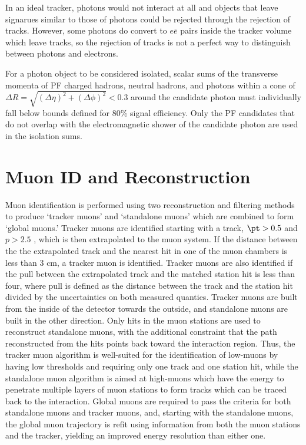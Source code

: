  In an ideal tracker, photons would not interact 
  at all and objects that leave signarues
  similar to those of photons could be rejected
  through the rejection of tracks.
 However, some photons do convert to $e\overline{e}$
  pairs inside the tracker volume which leave tracks,
  so the rejection of tracks is not a perfect way 
  to distinguish between photons and electrons.

For a photon object to be considered isolated,
 scalar sums of the transverse momenta of PF charged hadrons, neutral
 hadrons, and photons within a cone of $\Delta R = \sqrt{(\Delta
  \eta)^2 + (\Delta \phi)^2} < 0.3$ around the candidate photon must
 individually fall below bounds defined for 80\% signal
 efficiency. 
Only the PF candidates that do not overlap with the 
 electromagnetic shower of the candidate photon are used in the 
 isolation sums.


\section{Muon ID and Reconstruction}

 Muon identification is performed using
  two reconstruction and filtering methods to produce 
  `tracker muons' and `standalone muons' which are 
  combined to form  `global muons.'
 Tracker muons are identified starting with
  a track, $\pt>0.5$ \GeV and $p>2.5$ \GeV,
  which is then extrapolated to the muon system.
 If the distance between the the extrapolated
  track and the nearest hit in one of the muon 
  chambers is less than 3 cm, a tracker muon
  is identified.
 Tracker muons are also identified if the 
  pull between the extrapolated track and the
  matched station hit is less than four, where
  pull is defined as the distance between
  the track and the station hit divided by 
  the uncertainties on both measured quanties.
 Tracker muons are built from the inside of the
  detector towards the outside, and 
  standalone muons are built in the other direction.
 Only hits in the muon stations are used to 
  reconstruct standalone muons, with the 
  additional constraint that the path reconstructed
  from the hits points back toward the 
  interaction region.
 Thus, the tracker muon algorithm is well-suited
  for the identification of low-\pt muons by having
  low thresholds and requiring only one track
  and one station hit, while the standalone
  muon algorithm is aimed at high-\pt muons
  which have the energy to penetrate multiple layers
  of muon stations to form tracks which can be
  traced back to the interaction.
 Global muons are required to pass the criteria for both 
  standalone muons and tracker muons, and,
  starting with the standalone muons, 
  the global muon trajectory is refit using information from both 
  the muon stations and the tracker,
  yielding an improved energy resolution than either one.

